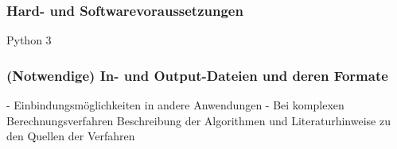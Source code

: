 \subsubsection{Hard- und Softwarevoraussetzungen}

Python 3 


\subsubsection{(Notwendige) In- und Output-Dateien und deren Formate}



- Einbindungsmöglichkeiten in andere Anwendungen
- Bei komplexen Berechnungsverfahren Beschreibung der Algorithmen und Literaturhinweise zu den Quellen der Verfahren


    
